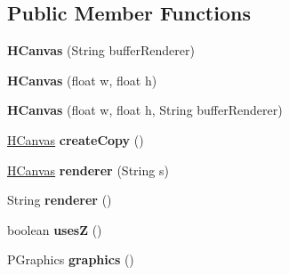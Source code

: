 \subsection*{Public Member Functions}
\begin{DoxyCompactItemize}
\item 
\hypertarget{classhype_1_1drawable_1_1_h_canvas_a7d573c3963fd1fcabdc026e5b29f0831}{{\bfseries H\-Canvas} (String buffer\-Renderer)}\label{classhype_1_1drawable_1_1_h_canvas_a7d573c3963fd1fcabdc026e5b29f0831}

\item 
\hypertarget{classhype_1_1drawable_1_1_h_canvas_a81857335bcf9b8fad8a5e5a47ce39890}{{\bfseries H\-Canvas} (float w, float h)}\label{classhype_1_1drawable_1_1_h_canvas_a81857335bcf9b8fad8a5e5a47ce39890}

\item 
\hypertarget{classhype_1_1drawable_1_1_h_canvas_a838ebf70002399a4459ada84f792ef89}{{\bfseries H\-Canvas} (float w, float h, String buffer\-Renderer)}\label{classhype_1_1drawable_1_1_h_canvas_a838ebf70002399a4459ada84f792ef89}

\item 
\hypertarget{classhype_1_1drawable_1_1_h_canvas_a908f9a44d52db58cb91cd6de3e9ff5c2}{\hyperlink{classhype_1_1drawable_1_1_h_canvas}{H\-Canvas} {\bfseries create\-Copy} ()}\label{classhype_1_1drawable_1_1_h_canvas_a908f9a44d52db58cb91cd6de3e9ff5c2}

\item 
\hypertarget{classhype_1_1drawable_1_1_h_canvas_a22d679cbf7f9c63de35f9c9a8dba532a}{\hyperlink{classhype_1_1drawable_1_1_h_canvas}{H\-Canvas} {\bfseries renderer} (String s)}\label{classhype_1_1drawable_1_1_h_canvas_a22d679cbf7f9c63de35f9c9a8dba532a}

\item 
\hypertarget{classhype_1_1drawable_1_1_h_canvas_aab3cd5e88afcc34afc38ace3ffcbf2ed}{String {\bfseries renderer} ()}\label{classhype_1_1drawable_1_1_h_canvas_aab3cd5e88afcc34afc38ace3ffcbf2ed}

\item 
\hypertarget{classhype_1_1drawable_1_1_h_canvas_a9568a4eaab025dfd2fe66e68c9ef1d01}{boolean {\bfseries uses\-Z} ()}\label{classhype_1_1drawable_1_1_h_canvas_a9568a4eaab025dfd2fe66e68c9ef1d01}

\item 
\hypertarget{classhype_1_1drawable_1_1_h_canvas_a4dfb72be531c1dbb845770db1277f807}{P\-Graphics {\bfseries graphics} ()}\label{classhype_1_1drawable_1_1_h_canvas_a4dfb72be531c1dbb845770db1277f807}


\end{DoxyCompactItemize}
